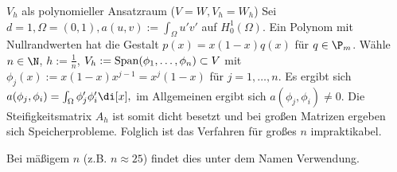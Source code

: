 \begin{ex} \label{3.52}
	$V_h$ als polynomieller Ansatzraum ($V = W, V_h = W_h$)
	Sei $d = 1, \Omega = (0,1), a(u,v) := \int_\Omega u' v'$ auf $H_0^1(\Omega)$.
	Ein Polynom mit Nullrandwerten hat die Gestalt $p(x) = x(1-x)q(x)$ für $q \in \P_m$.
	Wähle $n \in \N$, $h := \frac{1}{n}$, $V_h := \operatorname{Span}(\phi_1, \dotsc, \phi_n) \subset V$ mit $\phi_j(x) := x(1-x) x^{j-1} = x^j (1-x)$ für $j = 1, \dotsc, n$.
	Es ergibt sich
	\begin{math}
		a(\phi_j, \phi_i)
		= \int_\Omega \phi_j' \phi_i' \di[x],
	\end{math}
	im Allgemeinen ergibt sich $a(\phi_j, \phi_i) \neq 0$.
	Die Steifigkeitsmatrix $A_h$ ist somit dicht besetzt und bei großen Matrizen ergeben sich Speicherprobleme.
	Folglich ist das Verfahren für großes $n$ impraktikabel.

	Bei mäßigem $n$ (z.B. $n \approx 25$) findet dies unter dem Namen  Verwendung.
\end{ex}

